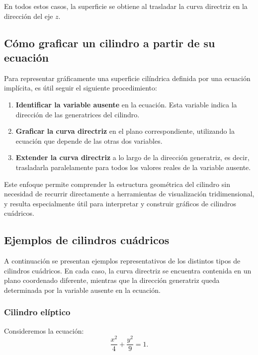 \documentclass[11pt]{article}
\begin{document}
En todos estos casos, la superficie se obtiene al trasladar la curva directriz en la dirección del eje $z$.

\subsection*{Cómo graficar un cilindro a partir de su ecuación}

Para representar gráficamente una superficie cilíndrica definida por una ecuación implícita, es útil seguir el siguiente procedimiento:

\begin{enumerate}
    \item \textbf{Identificar la variable ausente} en la ecuación.  
    Esta variable indica la dirección de las generatrices del cilindro.

    \item \textbf{Graficar la curva directriz} en el plano correspondiente, utilizando la ecuación que depende de las otras dos variables.

    \item \textbf{Extender la curva directriz} a lo largo de la dirección generatriz, es decir, trasladarla paralelamente para todos los valores reales de la variable ausente.
\end{enumerate}

Este enfoque permite comprender la estructura geométrica del cilindro sin necesidad de recurrir directamente a herramientas de visualización tridimensional, y resulta especialmente útil para interpretar y construir gráficos de cilindros cuádricos.

\subsection*{Ejemplos de cilindros cuádricos}

A continuación se presentan ejemplos representativos de los distintos tipos de cilindros cuádricos. En cada caso, la curva directriz se encuentra contenida en un plano coordenado diferente, mientras que la dirección generatriz queda determinada por la variable ausente en la ecuación.

\medskip

\subsubsection*{Cilindro elíptico}

Consideremos la ecuación:
\[
\frac{x^2}{4}+\frac{y^2}{9}=1.
\]
\end{document}
